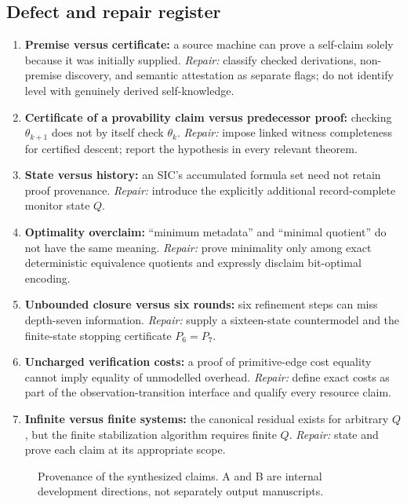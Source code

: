 \documentclass[11pt,letterpaper]{article}
\begin{document}
\subsection*{Defect and repair register}
\begin{enumerate}[leftmargin=*]
\item \textbf{Premise versus certificate:} a source machine can prove a self-claim solely because it was initially supplied. \emph{Repair:} classify checked derivations, non-premise discovery, and semantic attestation as separate flags; do not identify level with genuinely derived self-knowledge.
\item \textbf{Certificate of a provability claim versus predecessor proof:} checking $\theta_{k+1}$ does not by itself check $\theta_k$. \emph{Repair:} impose linked witness completeness for certified descent; report the hypothesis in every relevant theorem.
\item \textbf{State versus history:} an SIC's accumulated formula set need not retain proof provenance. \emph{Repair:} introduce the explicitly additional record-complete monitor state $Q$.
\item \textbf{Optimality overclaim:} ``minimum metadata'' and ``minimal quotient'' do not have the same meaning. \emph{Repair:} prove minimality only among exact deterministic equivalence quotients and expressly disclaim bit-optimal encoding.
\item \textbf{Unbounded closure versus six rounds:} six refinement steps can miss depth-seven information. \emph{Repair:} supply a sixteen-state countermodel and the finite-state stopping certificate $P_6=P_7$.
\item \textbf{Uncharged verification costs:} a proof of primitive-edge cost equality cannot imply equality of unmodelled overhead. \emph{Repair:} define exact costs as part of the observation-transition interface and qualify every resource claim.
\item \textbf{Infinite versus finite systems:} the canonical residual exists for arbitrary $Q$, but the finite stabilization algorithm requires finite $Q$. \emph{Repair:} state and prove each claim at its appropriate scope.
\end{enumerate}
\begin{figure}[htbp]\centering
{}
\caption{Provenance of the synthesized claims. A and B are internal development directions, not separately output manuscripts.}
\end{figure}
\end{document}
